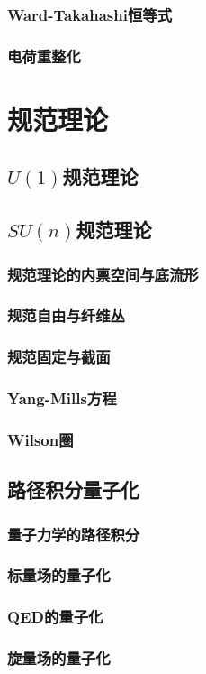 \documentclass[a4paper,11pt]{book}
\begin{document}
\section{Ward-Takahashi恒等式}
\section{电荷重整化}
\part{规范理论}
\chapter{$U(1)$规范理论}
\chapter{$SU(n)$规范理论}
\section{规范理论的内禀空间与底流形}
\section{规范自由与纤维丛}
\section{规范固定与截面}
\section{Yang-Mills方程}
\section{Wilson圈}
\chapter{路径积分量子化}
\section{量子力学的路径积分}
\section{标量场的量子化}
\section{QED的量子化}
\section{旋量场的量子化}
\end{document}
